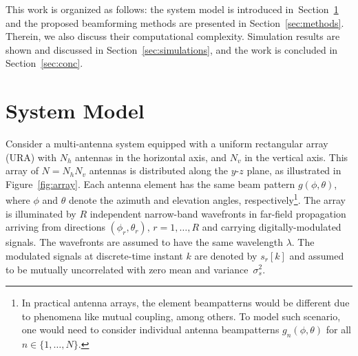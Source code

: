 \documentclass{cta-author}
\begin{document}
This work is organized as follows: the system model is introduced in~Section~\ref{sec:signal} and the proposed beamforming methods are presented in Section~\ref{sec:methods}. Therein, we also discuss their computational complexity. Simulation results are shown and discussed in Section~\ref{sec:simulations}, and the work is concluded in Section~\ref{sec:conc}.

\section{System  Model} \label{sec:signal}

Consider a multi-antenna system equipped with a uniform rectangular array (URA) with $N_h$ antennas in the horizontal axis, and $N_v$ in the vertical axis. This array of $N = N_h N_v$ antennas is distributed along the $y$-$z$ plane, as illustrated in Figure~\ref{fig:array}. Each antenna element has the same beam pattern $g(\phi, \theta)$, where $\phi$ and $\theta$ denote the azimuth and elevation angles, respectively\footnote{In practical antenna arrays, the element beampatterns would be different due to phenomena like mutual coupling, among others. To model such scenario, one would need to consider individual antenna beampatterns $g_n(\phi,\theta)$ for all $n \in \{1,\ldots,N\}$.}. The array is illuminated by $R$ independent narrow-band wavefronts in far-field propagation arriving from directions $(\phi_r, \theta_r),\,r=1,\ldots,R$ and carrying digitally-modulated signals. The wavefronts are assumed to have the same wavelength $\lambda$. The modulated signals at discrete-time instant $k$ are denoted by $s_r[k]$ and assumed to be mutually uncorrelated with zero mean and variance~$\sigma_{s}^2$.
\end{document}
